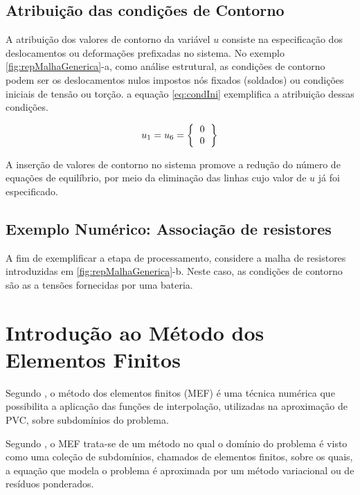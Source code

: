 \documentclass[
    12pt,               %
    openright,          %
    oneside,
    a4paper,            %
    english,            %
    french,             %
    spanish,            %
    brazil              %
    ]{abntex2}
\begin{document}
    
\subsection{Atribuição das condições de Contorno}
A atribuição dos valores de contorno da variável $u$ consiste na especificação dos deslocamentos ou deformações prefixadas no sistema. No exemplo \ref{fig:repMalhaGenerica}-a, como análise estrutural, as condições de contorno podem ser os deslocamentos nulos impostos nós fixados (soldados) ou condições iniciais de tensão ou torção. a equação \ref{eq:condIni} exemplifica a atribuição dessas condições.

\begin{equation}
    \label{eq:condIni}
    u_1 = u_6 = 
        \left \{
        \begin{tabular}{c}
            $0$ \\
            $0$ \\
        \end{tabular}       
        \right \}   
\end{equation}

A inserção de valores de contorno no sistema promove a redução do número de equações de equilíbrio, por meio da eliminação das linhas cujo valor de $u$ já foi especificado.

\subsection{Exemplo Numérico: Associação de resistores}

A fim de exemplificar a etapa de processamento,  considere a malha de resistores introduzidas  em \ref{fig:repMalhaGenerica}-b. Neste caso, as condições de contorno são as a tensões fornecidas por uma bateria.



\section{Introdução ao Método dos Elementos Finitos}

Segundo , o método dos elementos finitos (MEF) é uma técnica numérica que possibilita a aplicação das funções de interpolação, utilizadas na aproximação de PVC, sobre subdomínios do problema.

Segundo , o MEF trata-se de um método no qual o domínio do problema é visto como uma coleção de subdomínios, chamados de elementos finitos, sobre os quais, a equação que modela o problema é aproximada por um método variacional ou de resíduos ponderados.
\end{document}
